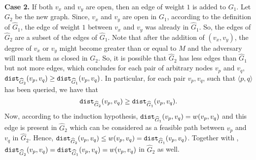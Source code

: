 \documentclass[11pt]{article}
\newcommand{\1}{\mathmybb{1}}
\newcommand{\dist}{\textnormal{\texttt{dist}}}
\begin{document}
    \medskip
    \noindent \textbf{Case 2.}
    If both $v_x$ and $v_y$ are open, then an edge of weight $1$ is added to $G_1$.
    Let $G_2$ be the new graph.
    Since, $v_x$ and $v_y$ are open in $G_1$, according to the definition of $\widehat G_1$, the edge of weight $1$ between $v_x$ and $v_y$ was already in $\widehat G_1$.
    So, the edges of $\widehat G_2$ are a subset of the edges of $\widehat G_1$.
    Note that after the addition of $(v_x,v_y)$, the degree of $v_x$ or $v_y$ might become greater than or equal to $M$ and the adversary will mark them as closed in $G_2$.
    So, it is possible that $\widehat G_2$ has less edges than $\widehat G_1$ but not more edges, which concludes for each pair of arbitrary nodes $v_p$ and $v_q$, $\dist_{\widehat G_2}(v_p,v_q) \geq \dist_{\widehat  G_1}(v_p,v_q)$.
    In particular, for each pair $v_p,v_q$, such that $\langle p,q \rangle$ has been queried, we have that
    \begin{equation}\label{eq:some-inequality}
        \dist_{\widehat G_2}(v_p,v_q) \geq \dist_{\widehat  G_1}(v_p,v_q).
    \end{equation}
    Now, according to the induction hypothesis, $\dist_{\widehat G_1}(v_p,v_q) = w(v_p,v_q)$ and this edge is present in $\widehat G_2$ which can be considered as a feasible path between $v_p$ and $v_q$ in $\widehat G_2$.
    Hence, $\dist_{\widehat G_2}(v_p,v_q) \leq w(v_p,v_q) = \dist_{\widehat G_1}(v_p,v_q)$.
    Together with , $\dist_{\widehat G_2}(v_p,v_q) = \dist_{\widehat G_1}(v_p,v_q) = w(v_p,v_q)$ in $\widehat G_2$ as well.
\end{document}
